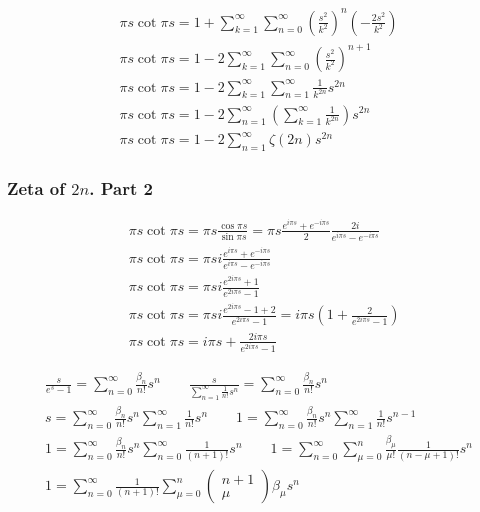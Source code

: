 	$$
	\begin{gathered}
		\pi s \cot \pi s=1+\sum_{k=1}^{\infty} \sum_{n=0}^{\infty}\left(\frac{s^2}{k^2}\right)^n\left(-\frac{2 s^2}{k^2}\right) \\
		\pi s \cot \pi s=1-2 \sum_{k=1}^{\infty} \sum_{n=0}^{\infty}\left(\frac{s^2}{k^2}\right)^{n+1} \\
		\pi s \cot \pi s=1-2 \sum_{k=1}^{\infty} \sum_{n=1}^{\infty} \frac{1}{k^{2 n}} s^{2 n} \\
		\pi s \cot \pi s=1-2 \sum_{n=1}^{\infty}\left(\sum_{k=1}^{\infty} \frac{1}{k^{2 n}}\right) s^{2 n} \\
		\pi s \cot \pi s=1-2 \sum_{n=1}^{\infty} \zeta(2 n) s^{2 n}
	\end{gathered}
	$$
	
	\subsubsection{Zeta of $2n$. Part 2}
	
	$$
	\begin{aligned}
		& \pi s \cot \pi s= \pi s \frac{\cos \pi s}{\sin \pi s}=\pi s \frac{e^{i \pi s}+e^{-i \pi s}}{2} \frac{2 i}{e^{i \pi s}-e^{-i \pi s}} \\
		& \pi s \cot \pi s=\pi s i \frac{e^{i \pi s}+e^{-i \pi s}}{e^{i \pi s}-e^{-i \pi s}} \\
		& \pi s \cot \pi s=\pi s i \frac{e^{2 i \pi s}+1}{e^{2 i \pi s}-1} \\
		& \pi s \cot \pi s= \pi s i \frac{e^{2 i \pi s}-1+2}{e^{2 i \pi s}-1}=i \pi s\left(1+\frac{2}{e^{2 i \pi s}-1}\right) \\
		& \pi s \cot \pi s=i \pi s+\frac{2 i \pi s}{e^{2 i \pi s}-1}
	\end{aligned}
	$$
	
	$$
	\begin{gathered}
		\frac{s}{e^s-1}=\sum_{n=0}^{\infty} \frac{\beta_n}{n !} s^n \qquad \frac{s}{\sum_{n=1}^{\infty} \frac{1}{n !} s^n}=\sum_{n=0}^{\infty} \frac{\beta_n}{n !} s^n \\
		s=\sum_{n=0}^{\infty} \frac{\beta_n}{n !} s^n \sum_{n=1}^{\infty} \frac{1}{n !} s^n \qquad 1=\sum_{n=0}^{\infty} \frac{\beta_n}{n !} s^n \sum_{n=1}^{\infty} \frac{1}{n !} s^{n-1} \\
		1=\sum_{n=0}^{\infty} \frac{\beta_n}{n !} s^n \sum_{n=0}^{\infty} \frac{1}{(n+1) !} s^n \qquad 1=\sum_{n=0}^{\infty} \sum_{\mu=0}^n \frac{\beta_\mu}{\mu !} \frac{1}{(n-\mu+1)!} s^n \\
		1=\sum_{n=0}^{\infty} \frac{1}{(n+1) !} \sum_{\mu=0}^n\left(\begin{array}{c}
			n+1 \\
			\mu
		\end{array}\right) \beta_\mu s^n
	\end{gathered}
	$$
	
